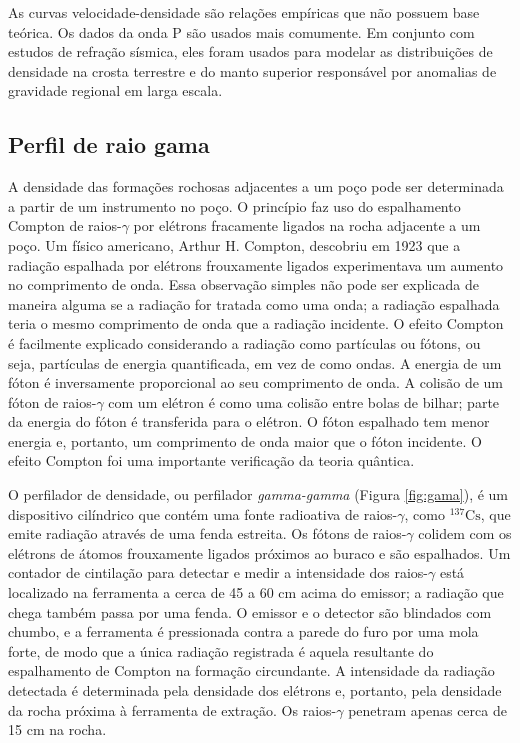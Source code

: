 \documentclass[]{book}
\theoremstyle{definition}
\theoremstyle{definition}
\theoremstyle{definition}
\theoremstyle{remark}
\begin{document}
As curvas velocidade-densidade são relações empíricas que não possuem base teórica. Os dados da onda P são usados mais comumente. Em conjunto com estudos de refração sísmica, eles foram usados para modelar as distribuições de densidade na crosta terrestre e do manto superior responsável por anomalias de gravidade regional em larga escala.

\hypertarget{perfil-de-raio-gama}{%
\subsection{Perfil de raio gama}\label{perfil-de-raio-gama}}

A densidade das formações rochosas adjacentes a um poço pode ser determinada a partir de um instrumento no poço. O princípio faz uso do espalhamento Compton de raios-\(\gamma\) por elétrons fracamente ligados na rocha adjacente a um poço. Um físico americano, Arthur H. Compton, descobriu em 1923 que a radiação espalhada por elétrons frouxamente ligados experimentava um aumento no comprimento de onda. Essa observação simples não pode ser explicada de maneira alguma se a radiação for tratada como uma onda; a radiação espalhada teria o mesmo comprimento de onda que a radiação incidente. O efeito Compton é facilmente explicado considerando a radiação como partículas ou fótons, ou seja, partículas de energia quantificada, em vez de como ondas. A energia de um fóton é inversamente proporcional ao seu comprimento de onda. A colisão de um fóton de raios-\(\gamma\) com um elétron é como uma colisão entre bolas de bilhar; parte da energia do fóton é transferida para o elétron. O fóton espalhado tem menor energia e, portanto, um comprimento de onda maior que o fóton incidente. O efeito Compton foi uma importante verificação da teoria quântica.

O perfilador de densidade, ou perfilador \emph{gamma-gamma} (Figura \ref{fig:gama}), é um dispositivo cilíndrico que contém uma fonte radioativa de raios-\(\gamma\), como \(^{137}\mathrm{Cs}\), que emite radiação através de uma fenda estreita. Os fótons de raios-\(\gamma\) colidem com os elétrons de átomos frouxamente ligados próximos ao buraco e são espalhados. Um contador de cintilação para detectar e medir a intensidade dos raios-\(\gamma\) está localizado na ferramenta a cerca de 45 a 60 cm acima do emissor; a radiação que chega também passa por uma fenda. O emissor e o detector são blindados com chumbo, e a ferramenta é pressionada contra a parede do furo por uma mola forte, de modo que a única radiação registrada é aquela resultante do espalhamento de Compton na formação circundante. A intensidade da radiação detectada é determinada pela densidade dos elétrons e, portanto, pela densidade da rocha próxima à ferramenta de extração. Os raios-\(\gamma\) penetram apenas cerca de 15 cm na rocha.
\end{document}
